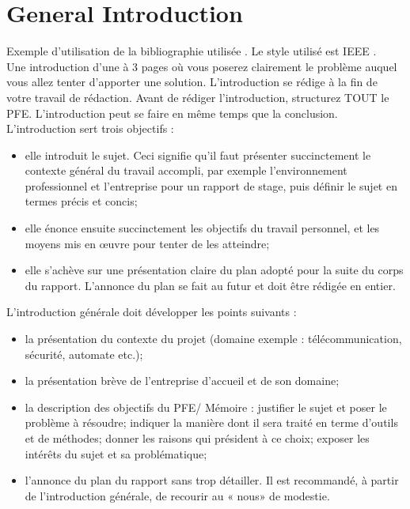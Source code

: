 \chapter*{General Introduction}

Exemple d'utilisation de la bibliographie utilisée \cite{webArticle2}. Le style utilisé est IEEE \cite{webArticle1}.\\

Une introduction d’une à 3 pages où vous poserez clairement le problème auquel vous allez tenter d’apporter une solution. L’introduction se rédige à la fin de votre travail de rédaction. Avant de rédiger l’introduction, structurez TOUT le PFE. L’introduction peut se faire en même temps que la conclusion.\\

L’introduction sert trois objectifs :
\begin{itemize}
\item elle introduit le sujet. Ceci signifie qu’il faut présenter succinctement le contexte général du travail accompli, par exemple l’environnement professionnel et l’entreprise pour un rapport de stage, puis définir le sujet en termes précis et concis;
\item elle énonce ensuite succinctement les objectifs du travail personnel, et les moyens mis en œuvre pour tenter de les atteindre;
\item elle s’achève sur une présentation claire du plan adopté pour la suite du corps du rapport. L’annonce du plan se fait au futur et doit être rédigée en entier.
\end{itemize}

\null

L’introduction générale doit développer les points suivants :
\begin{itemize}
\item la présentation du contexte du projet (domaine exemple : télécommunication, sécurité, automate etc.);
\item la présentation brève de l’entreprise d’accueil et de son domaine;
\item la description des objectifs du PFE/ Mémoire : justifier le sujet et poser le problème à résoudre; indiquer  la manière dont il sera traité en terme d’outils et de méthodes; donner les raisons qui président à ce choix; exposer les intérêts du sujet et sa problématique;
\item l’annonce du plan du rapport sans trop détailler.  Il est recommandé, à partir de l’introduction générale, de recourir au « nous» de modestie.
\end{itemize}